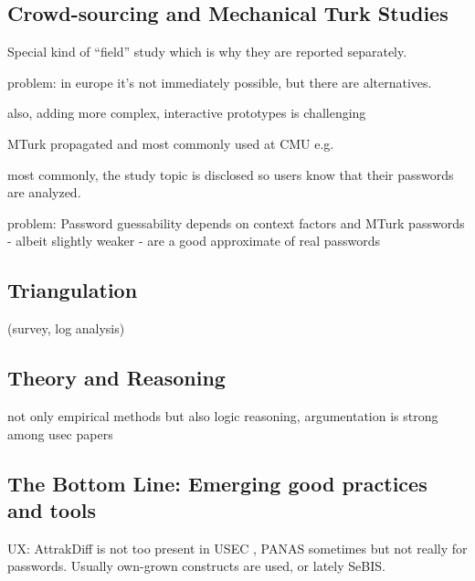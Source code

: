 \subsection{Crowd-sourcing and Mechanical Turk Studies}
Special kind of ``field'' study which is why they are reported separately.

problem: in europe it's not immediately possible, but there are alternatives. 

also, adding more complex, interactive prototypes is challenging

\cite{Peer2017BeyondTheTurk}
\cite{Ross2010WhoAreTurkers}
\cite{Savage2012GainingWisdomCrowds}

MTurk
propagated and most commonly used at CMU e.g. \cite{Mazurek2013Measuring} \cite{Shay2014CanLongPasswordsBeSecureAndUsable} \cite{Shay2016DesigningPasswordPolicies}
\cite{Shay2015UsablePoliciesMTurk}
\cite{Ur2016PerceptionsPassword} \cite{Melicher2016UsabilityMobileTextPasswords} \cite{Ur2017DataDrivenPWMeter}

most commonly, the study topic is disclosed so users know that their passwords are analyzed. 

\cite{Huha2015UserReplaceablePasswords}

problem:
Password guessability depends on context factors and MTurk passwords - albeit slightly weaker - are a good approximate of real passwords \cite{Mazurek2013Measuring}


\subsection{Triangulation}
(survey, log analysis) \cite{Wash2016UnderstandingPasswordChoices}

\subsection{Theory and Reasoning}
not only empirical methods but also logic reasoning, argumentation is strong among usec papers


\subsection{The Bottom Line: Emerging good practices and tools}

UX: AttrakDiff is not too present in USEC \cite{Hassenzahl2003AttrakDiffGerman}, PANAS sometimes \cite{Rosoff2014BehavioralExperimentsFraud} but not really for passwords. Usually own-grown constructs are used, or lately SeBIS.

